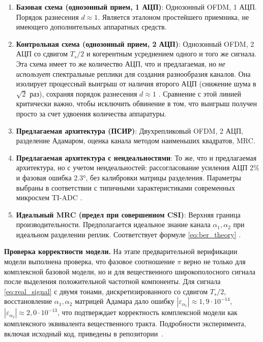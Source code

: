 \documentclass[a4paper,12pt]{article}
\numberwithin{equation}{section}
\begin{document}
\begin{enumerate}
    \item \textbf{Базовая схема (однозонный прием, 1 АЦП)}: Однозонный OFDM, 1 АЦП. Порядок разнесения $d \approx 1$. Является эталоном простейшего приемника, не имеющего дополнительных аппаратных средств.
    \item \textbf{Контрольная схема (однозонный прием, 2 АЦП)}: Однозонный OFDM, 2 АЦП со сдвигом $T_s/2$ и когерентным усреднением одного и того же сигнала. Эта схема имеет то же количество АЦП, что и предлагаемая, но \textit{не использует} спектральные реплики для создания разнообразия каналов. Она изолирует процессный выигрыш от наличия второго АЦП (снижение шума в $\sqrt{2}$ раз), сохраняя порядок разнесения $d \approx 1$ \cite{walden}. Сравнение с этой линией критически важно, чтобы исключить обвинение в том, что выигрыш получен просто за счет удвоения количества аппаратуры.
    \item \textbf{Предлагаемая архитектура (ПСИР)}: Двухрепликовый OFDM, 2 АЦП, разделение Адамаром, оценка канала методом наименьших квадратов, MRC.
    \item \textbf{Предлагаемая архитектура с неидеальностями}: То же, что и предлагаемая архитектура, но с учетом неидеальностей: рассогласование усиления АЦП 2\% и фазовая ошибка 2.3°, без калибровки матрицы разделения. Параметры выбраны в соответствии с типичными характеристиками современных микросхем TI-ADC \cite{ieee_std,adi_mt008,razavi}.
    \item \textbf{Идеальный MRC (предел при совершенном CSI)}: Верхняя граница производительности. Предполагается идеальное знание канала $\alpha_1, \alpha_2$ при идеальном разделении реплик. Соответствует формуле \eqref{eq:ber_theory} \cite{proakis}.
\end{enumerate}

\textbf{Проверка корректности модели.} На этапе предварительной верификации модели выполнена проверка, что фазовое соотношение $\pi$ верно не только для комплексной базовой модели, но и для вещественного широкополосного сигнала после выделения положительной частотной компоненты. Для сигнала \eqref{eq:real_signal} с двумя тонами, дискретизированного со сдвигом $T_s/2$, восстановление $\alpha_1,\alpha_2$ матрицей Адамара дало ошибку $|\varepsilon_{\alpha_1}|\approx1{,}9\cdot10^{-14}$, $|\varepsilon_{\alpha_2}|\approx2{,}0\cdot10^{-13}$, что подтверждает корректность комплексной модели как комплексного эквивалента вещественного тракта. Подробности эксперимента, включая исходный код, приведены в репозитории~\cite{github}.
\end{document}
